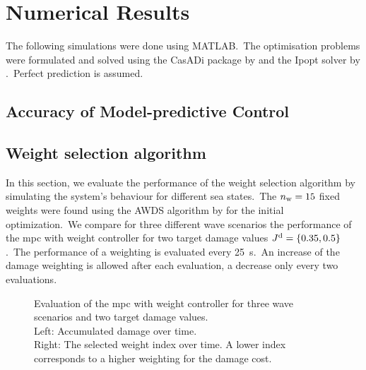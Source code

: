 \section{Numerical Results}

The following simulations were done using MATLAB.\ 
The optimisation problems were formulated and solved using the CasADi package by \cite{Andersson2019casadi} and the Ipopt solver by \cite{Waechter2006ipopt}.\
Perfect prediction is assumed.\ 

\subsection{Accuracy of Model-predictive Control}

\subsection{Weight selection algorithm}
In this section, we evaluate the performance of the weight selection algorithm by simulating the system's behaviour for different sea states.\ 
The $n_\mathrm{w}=15$ fixed weights were found using the AWDS algorithm by \cite{Ryu2019} for the initial optimization.\ 
We compare for three different wave scenarios the performance of the \ac{mpc} with weight controller for two target damage values $J^\mathrm{d} = \left\{0.35, 0.5\right\}$.\ 
The performance of a weighting is evaluated every \SI{25}{\second}.\ 
An increase of the damage weighting is allowed after each evaluation, a decrease only every two evaluations.
\begin{figure}[htb]
\label{fig:weight_control}
\centering
\fontsize{11}{0}\selectfont
\def\svgwidth{0.2\textwidth}

\caption{Evaluation of the \ac{mpc} with weight controller for three wave scenarios and two target damage values.\\Left: Accumulated damage over time.\\ Right: The selected weight index \iw over time. A lower index corresponds to a higher weighting for the damage cost.}
\end{figure}